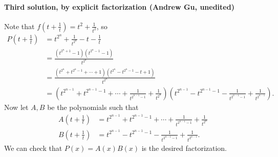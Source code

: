 \paragraph{Third solution, by explicit factorization (Andrew Gu, unedited)}     Note that $f\left(t+\tfrac{1}{t}\right)=t^2+\tfrac{1}{t^2}$, so
\begin{align*}
    P\left(t+\frac{1}{t}\right) &=t^{2^n}+\frac{1}{t^{2^n}}-t-\frac{1}{t} \\
    &=\frac{(t^{2^n+1}-1)(t^{2^n-1}-1)}{t^{2^{n}}} \\
    &=\frac{(t^{2^n}+t^{2^{n}-1}+\dotsb+1)(t^{2^n}-t^{2^{n}-1}-t+1)}{t^{2^{n}}} \\
    &=\left(t^{2^{n-1}}+t^{2^{n-1}-1}+\dotsb+\frac{1}{t^{2^{n-1}-1}}+\frac{1}{t^{2^n}}\right)\left(t^{2^{n-1}}-t^{2^{n-1}-1}-\frac{1}{t^{2^{n-1}-1}}+\frac{1}{t^{2^{n-1}}}\right).
\end{align*}
Now let $A, B$ be the polynomials such that
\begin{align*}
    A\left(t+\frac{1}{t}\right) &=t^{2^{n-1}}+t^{2^{n-1}-1}+\dotsb+\frac{1}{t^{2^{n-1}-1}}+\frac{1}{t^{2^n}} \\
    B\left(t+\frac{1}{t}\right) &=t^{2^{n-1}}-t^{2^{n-1}-1}-\frac{1}{t^{2^{n-1}-1}}+\frac{1}{t^{2^{n-1}}}.
\end{align*}
We can check that $P(x)=A(x)B(x)$ is the desired factorization.

